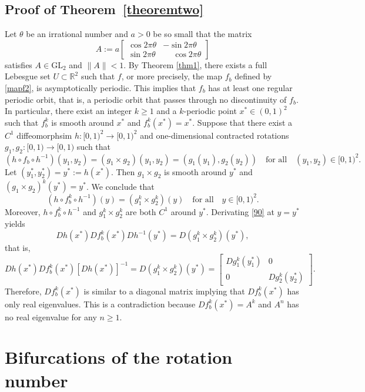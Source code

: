 \documentclass[12pt,reqno,a4paper]{amsart}%
\theoremstyle{definition}
\theoremstyle{remark}
\begin{document}
{\subsection{Proof of Theorem~\ref{theoremtwo}} Let $\theta$ be an irrational number and $a>0$ be so small that the matrix $$A:=a\begin{bmatrix} \cos2\pi\theta & -\sin2\pi\theta\\ \sin2\pi\theta & \phantom{-}\cos2\pi\theta
\end{bmatrix}$$ 
satisfies $A\in\mathrm{GL}_2$ and $\|A\|<1$. By Theorem \ref{thm1},
there exists a full Lebesgue set $U\subset\mathbb{R}^2$ such that $f$, or more precisely, the map $f_b$ defined by \eqref{mapf2}, is asymptotically periodic. This implies that $f_b$ has at least one regular periodic orbit, that is, a periodic orbit that passes through no discontinuity of $f_b$. In particular, there exist an integer $k\ge 1$ and a $k$-periodic point $x^*\in (0,1)^2$ such that $f_b^k$ is smooth around $x^*$ and $f_b^k(x^*)=x^*$. Suppose that there exist a $C^1$ diffeomorphsim $h: [0,1)^2\to [0,1)^2$ and one-dimensional contracted rotations $g_1,g_2:[0,1)\to [0,1)$ such that $$\left(h\circ f_b\circ h^{-1}\right)(y_1,y_2)= (g_1\times g_2)(y_1,y_2)= \left(g_1(y_1),g_2(y_2)\right) \quad\textrm{for all}\quad  (y_1,y_2)\in [0,1)^2.$$
Let $(y_1^*,y_2^*)=y^*:=h(x^*)$. Then $g_1\times g_2$ is smooth around $y^*$ and $(g_1\times g_2)^k(y^*)=y^*$. 
We conclude that
\begin{equation}\label{90}
\left(h\circ f_b^k\circ h^{-1}\right)(y)= (g_1^k\times g_2^k)(y)\quad\textrm{for all}\quad  y\in [0,1)^2.
\end{equation}
Moreover, $h\circ f_b^k\circ h^{-1}$ and $g_1^k\times g_2^k$ are both $C^1$ around $y^*$. Derivating \eqref{90} at $y=y^*$ yields 
$$
Dh (x^*) Df_b^k(x^*)Dh^{-1}(y^*) = D(g_1^k\times g_2^k)(y^*),
$$ that is,
$$Dh (x^*) Df_b^k(x^*)\left[Dh(x^*)\right]^{-1} = D(g_1^k\times g_2^k)(y^*)=\begin{bmatrix} Dg_1^k(y_1^*)& 0 \\ 0 & Dg_2^k(y_2^*)\end{bmatrix}.$$ Therefore, $Df_b^k(x^*)$ is similar to a diagonal matrix implying that $Df_b^k(x^*)$ has only real eigenvalues. This is a contradiction because $Df_b^k(x^*)=A^k$ and $A^n$ has no real eigenvalue for any $n\geq1$.   


\appendix
\section{Bifurcations of the rotation number}\label{appendix figure}

}
\end{document}

